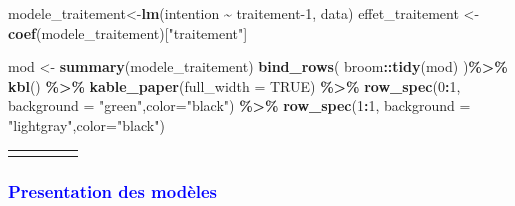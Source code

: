 \documentclass[
]{article}
\newenvironment{Shaded}{\begin{snugshade}}{\end{snugshade}}
\newcommand{\AttributeTok}[1]{\textcolor[rgb]{0.13,0.29,0.53}{#1}}
\newcommand{\ConstantTok}[1]{\textcolor[rgb]{0.56,0.35,0.01}{#1}}
\newcommand{\DecValTok}[1]{\textcolor[rgb]{0.00,0.00,0.81}{#1}}
\newcommand{\FunctionTok}[1]{\textcolor[rgb]{0.13,0.29,0.53}{\textbf{#1}}}
\newcommand{\NormalTok}[1]{#1}
\newcommand{\OtherTok}[1]{\textcolor[rgb]{0.56,0.35,0.01}{#1}}
\newcommand{\SpecialCharTok}[1]{\textcolor[rgb]{0.81,0.36,0.00}{\textbf{#1}}}
\newcommand{\StringTok}[1]{\textcolor[rgb]{0.31,0.60,0.02}{#1}}
\begin{document}
\hfill\break

\begin{Shaded}
\begin{Highlighting}[]
\NormalTok{modele\_traitement}\OtherTok{\textless{}{-}}\FunctionTok{lm}\NormalTok{(intention }\SpecialCharTok{\textasciitilde{}}\NormalTok{ traitement}\DecValTok{{-}1}\NormalTok{, data)}
\NormalTok{effet\_traitement }\OtherTok{\textless{}{-}} \FunctionTok{coef}\NormalTok{(modele\_traitement)[}\StringTok{"traitement"}\NormalTok{]}

\NormalTok{mod }\OtherTok{\textless{}{-}} \FunctionTok{summary}\NormalTok{(modele\_traitement)}
\FunctionTok{bind\_rows}\NormalTok{(}
\NormalTok{  broom}\SpecialCharTok{::}\FunctionTok{tidy}\NormalTok{(mod) }
\NormalTok{)}\SpecialCharTok{\%\textgreater{}\%}
  \FunctionTok{kbl}\NormalTok{() }\SpecialCharTok{\%\textgreater{}\%}
          \FunctionTok{kable\_paper}\NormalTok{(}\AttributeTok{full\_width =} \ConstantTok{TRUE}\NormalTok{) }\SpecialCharTok{\%\textgreater{}\%}
          \FunctionTok{row\_spec}\NormalTok{(}\DecValTok{0}\SpecialCharTok{:}\DecValTok{1}\NormalTok{, }\AttributeTok{background =} \StringTok{"green"}\NormalTok{,}\AttributeTok{color=}\StringTok{"black"}\NormalTok{) }\SpecialCharTok{\%\textgreater{}\%} 
          \FunctionTok{row\_spec}\NormalTok{(}\DecValTok{1}\SpecialCharTok{:}\DecValTok{1}\NormalTok{, }\AttributeTok{background =} \StringTok{"lightgray"}\NormalTok{,}\AttributeTok{color=}\StringTok{"black"}\NormalTok{)}
\end{Highlighting}
\end{Shaded}

\begin{tabu} to 
\hline
{} &  &  &  & \\
\hline
{} &  &  &  & \\
\hline
\end{tabu}

\hfill\break

\textcolor{blue}{\subsubsection{Presentation des modèles}}
\end{document}
